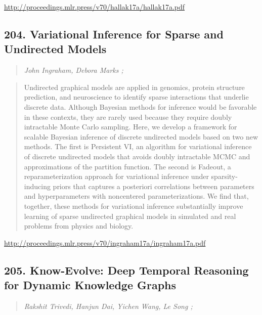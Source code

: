 \documentclass{article}
\begin{document}
\href{http://proceedings.mlr.press/v70/hallak17a/hallak17a.pdf}{http://proceedings.mlr.press/v70/hallak17a/hallak17a.pdf}

\subsection{204. Variational Inference for Sparse and Undirected Models}

\begin{quote}
\footnotesize{\textit{John Ingraham, Debora Marks ;}}
\end{quote}

\begin{quote}
    Undirected graphical models are applied in genomics, protein structure prediction, and neuroscience to identify sparse interactions that underlie discrete data. Although Bayesian methods for inference would be favorable in these contexts, they are rarely used because they require doubly intractable Monte Carlo sampling. Here, we develop a framework for scalable Bayesian inference of discrete undirected models based on two new methods. The first is Persistent VI, an algorithm for variational inference of discrete undirected models that avoids doubly intractable MCMC and approximations of the partition function. The second is Fadeout, a reparameterization approach for variational inference under sparsity-inducing priors that captures a posteriori correlations between parameters and hyperparameters with noncentered parameterizations. We find that, together, these methods for variational inference substantially improve learning of sparse undirected graphical models in simulated and real problems from physics and biology.  \end{quote}

\href{http://proceedings.mlr.press/v70/ingraham17a/ingraham17a.pdf}{http://proceedings.mlr.press/v70/ingraham17a/ingraham17a.pdf}

\subsection{205. Know-Evolve: Deep Temporal Reasoning for Dynamic Knowledge Graphs}

\begin{quote}
\footnotesize{\textit{Rakshit Trivedi, Hanjun Dai, Yichen Wang, Le Song ;}}
\end{quote}
\end{document}
